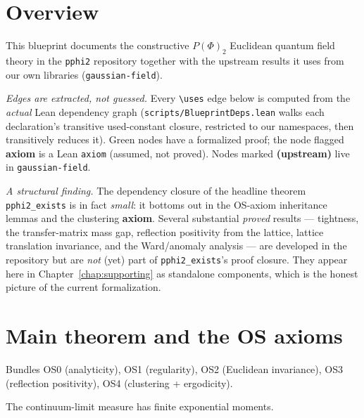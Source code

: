 \chapter{Overview}

This blueprint documents the constructive $P(\Phi)_2$ Euclidean quantum field
theory in the \texttt{pphi2} repository together with the upstream results it
uses from our own libraries (\texttt{gaussian-field}).

\emph{Edges are extracted, not guessed.} Every \texttt{\textbackslash uses} edge
below is computed from the \emph{actual} Lean dependency graph
(\texttt{scripts/BlueprintDeps.lean} walks each declaration's transitive
used-constant closure, restricted to our namespaces, then transitively reduces
it). Green nodes have a formalized proof; the node flagged \textbf{axiom} is a
Lean \texttt{axiom} (assumed, not proved). Nodes marked \textbf{(upstream)} live
in \texttt{gaussian-field}.

\emph{A structural finding.} The dependency closure of the headline theorem
\texttt{pphi2\_exists} is in fact \emph{small}: it bottoms out in the OS-axiom
inheritance lemmas and the clustering \textbf{axiom}. Several substantial
\emph{proved} results --- tightness, the transfer-matrix mass gap,
reflection positivity from the lattice, lattice translation invariance, and the
Ward/anomaly analysis --- are developed in the repository but are \emph{not}
(yet) part of \texttt{pphi2\_exists}'s proof closure. They appear here in
Chapter~\ref{chap:supporting} as standalone components, which is the honest
picture of the current formalization.

\chapter{Main theorem and the OS axioms}

\begin{definition}\label{def:full-os}
  \leanok
  Bundles OS0 (analyticity), OS1 (regularity), OS2 (Euclidean invariance),
  OS3 (reflection positivity), OS4 (clustering + ergodicity).
\end{definition}

\begin{theorem}\label{thm:expmom}
  \leanok
  The continuum-limit measure has finite exponential moments.
\end{theorem}

